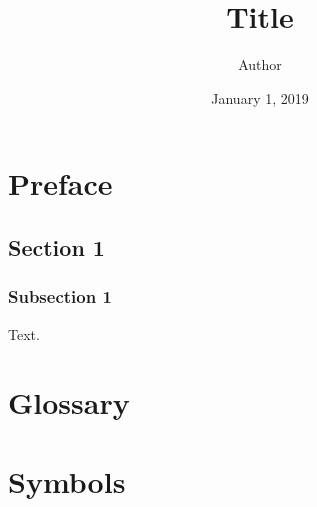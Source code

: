 \documentclass[a4paper]{book}
\begin{document}
\title{Title}
\author{Author}
\date{January 1, 2019}
\maketitle
\tableofcontents
\chapter*{Preface}
\section{Section 1}
\subsection{Subsection 1}
Text.
\blindtext[3]
\appendix
\cleardoublepage
{}
\chapter{Glossary}
\chapter{Symbols}
\clearpage
{}
\printindex
\end{document}
